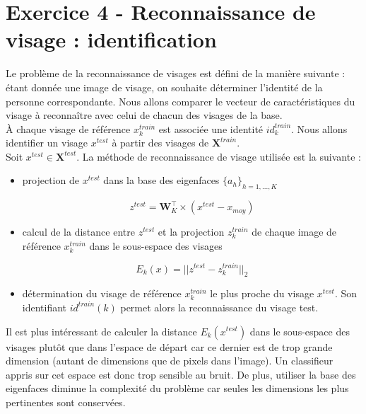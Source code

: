 \documentclass[a4paper]{article}
\begin{document}
\newpage

\section*{Exercice 4 - Reconnaissance de visage : identification}

Le problème de la reconnaissance de visages est défini de la manière suivante :
étant donnée une image de visage, on souhaite déterminer l’identité de la
personne correspondante. Nous allons comparer le vecteur de caractéristiques du
visage à reconnaître avec celui de chacun des visages de la base.\\

À chaque visage de référence $\mathit{x}^{train}_k$ est associée une identité
$id^{train}_k$. Nous allons identifier un visage $\mathit{x}^{test}$ à partir
des visages de $\mathbf{X}^{train}$.\\

Soit $\mathit{x}^{test} \in \mathbf{X}^{test}$. La méthode de reconnaissance de
visage utilisée est la suivante : 
\begin{itemize}
    \item projection de $\mathit{x}^{test}$ dans la base des eigenfaces
        $\{a_h\}_{h=1,...,K}$ 

        $$ \mathit{z^{test}} = \mathbf{W}^{\top}_K \times (\mathit{x}^{test} -
        \mathit{x}_{moy})$$
    \item calcul de la distance entre $\mathit{z}^{test}$ et la projection
        $\mathit{z}^{train}_k$ de chaque image de référence
        $\mathit{x}^{train}_k$ dans le sous-espace des visages 

        $$ E_k(\mathit{x}) = || \mathit{z}^{test} - \mathit{z}^{train}_k||_2$$
    \item détermination du visage de référence $\mathit{x}^{train}_k$ le plus
        proche du visage $\mathit{x}^{test}$. Son identifiant $id^{train}(k)$ permet
        alors la reconnaissance du visage test.\\
\end{itemize}

Il est plus intéressant de calculer la distance $E_k(\mathit{x}^{test})$ dans le
sous-espace des visages plutôt que dans l'espace de départ car ce dernier est de
trop grande dimension (autant de dimensions que de pixels dans l'image). Un
classifieur appris sur cet espace est donc trop sensible au bruit. De plus,
utiliser la base des eigenfaces diminue la complexité du problème car seules les
dimensions les plus pertinentes sont conservées. \\
\end{document}
